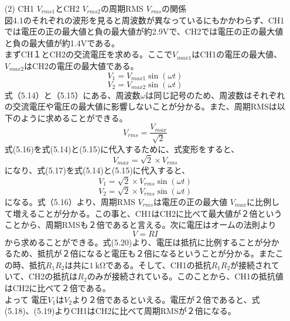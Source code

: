 \documentclass[12pt,a4paper]{jsarticle}
\numberwithin{equation}{section}
\numberwithin{figure}{section}
\numberwithin{table}{section}
\begin{document}
\begin{itemize}
	\newpage			
	\item [(2)]CH1 $V_{rms1}$とCH2 $V_{rms2}$の周期RMS $V_{rms}$の関係\\図4.1のそれぞれの波形を見ると周波数が異なっているにもかかわらず、CH1では電圧の正の最大値と負の最大値が約2.9Vで、CH2では電圧の正の最大値と負の最大値が約1.4Vである。\\まずCH１とCH2の交流電圧を求める。ここで$V_{max1}$はCH1の電圧の最大値、$V_{max2}$はCH2の電圧の最大値である。
						\begin{equation}
							V_1=V_{max1}\sin(\omega t)
						\end{equation}
						\begin{equation}
							V_2=V_{max2}\sin(\omega t)
						\end{equation}
						式（5.14）と（5.15）にある、周波数$\omega$は同じ記号のため、周波数はそれぞれの交流電圧や電圧の最大値に影響しないことが分かる。また、周期RMSは以下のように求めることができる。
						\begin{equation}
							V_{rms}=\dfrac{V_{max}}{\sqrt{2}}
						\end{equation}
						式(5.16)を式(5.14)と(5.15)に代入するために、式変形をすると、
						\begin{equation}
								V_{max}=\sqrt{2} \times V_{rms}
						\end{equation}
						になり、式(5.17)を式(5.14)と(5.15)に代入すると、
						\begin{equation}
							V_1=\sqrt{2} \times V_{rms}\sin(\omega t)
						\end{equation}
						\begin{equation}
							V_2=\sqrt{2} \times V_{rms}\sin(\omega t)
						\end{equation}
						になる。式（5.16）より、周期RMS $V_{rms}$は電圧の正の最大値 $V_{max}$に比例して増えることが分かる。この事と、CH1はCH2に比べて最大値が２倍ということから、周期RMSも２倍であると言える。次に電圧はオームの法則より
						\begin{equation}
							V=RI
						\end{equation}
						から求めることができる。式(5.20)より、電圧は抵抗に比例することが分かるため、抵抗が２倍になると電圧も２倍になるということが分かる。またこの時、抵抗$R_1$$R_2$は共に$\SI{1}{\kilo\ohm}$である。そして、CH1の抵抗$R_1$$R_2$が接続されていて、CH2の抵抗は$R_2$のみが接続されている。このことから、CH1の抵抗値はCH2に比べて２倍である。\\
						よって
						電圧$V_1$は$V_2$より２倍であるといえる。電圧が２倍であると、式(5.18)、(5.19)よりCH1はCH2に比べて周期RMSが２倍になる。
\end{itemize}
\end{document}
